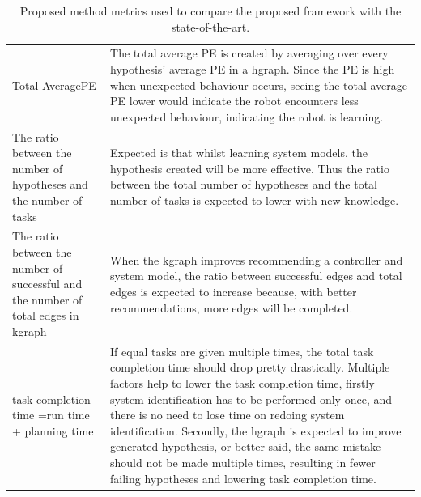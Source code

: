 \noindent
\begin{table}[H]
\centering
\begin{tabular}%
  {>{\raggedright\arraybackslash}p{}%
   >{\raggedright\arraybackslash}p{}}
Total Average\newline \acl{PE} & The total average \ac{PE} is created by averaging over every hypothesis' average \ac{PE} in a \ac{hgraph}. Since the \ac{PE} is high when unexpected behaviour occurs, seeing the total average \ac{PE} lower would indicate the robot encounters less unexpected behaviour, indicating the robot is learning.\\
The ratio between the number of hypotheses and the number of tasks & Expected is that whilst learning system models, the hypothesis created will be more effective. Thus the ratio between the total number of hypotheses and the total number of tasks is expected to lower with new knowledge.\\
The ratio between the number of successful and the number of total edges in \ac{kgraph} & When the \ac{kgraph} improves recommending a controller and system model, the ratio between successful edges and total edges is expected to increase because, with better recommendations, more edges will be completed.\\
task completion time =\newline run time + planning time& If equal tasks are given multiple times, the total task completion time should drop pretty drastically. Multiple factors help to lower the task completion time, firstly system identification has to be performed only once, and there is no need to lose time on redoing system identification. Secondly, the \ac{hgraph} is expected to improve generated hypothesis, or better said, the same mistake should not be made multiple times, resulting in fewer failing hypotheses and lowering task completion time.\\
\end{tabular}
\caption{Proposed method metrics used to compare the proposed framework with the state-of-the-art.}\label{table:proposed_method_metrics}
\end{table}

